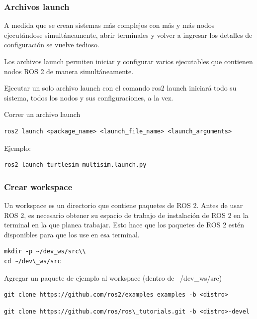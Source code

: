 \begin{frame}[fragile]
	\frametitle{Archivos launch}
	
	A medida que se crean sistemas más complejos con más y más nodos ejecutándose simultáneamente, abrir terminales y volver a ingresar los detalles de configuración se vuelve tedioso.
	
	Los archivos launch permiten iniciar y configurar varios ejecutables que contienen nodos ROS 2 de manera simultáneamente.
	
	Ejecutar un solo archivo launch con el comando ros2 launch iniciará todo su sistema, todos los nodos y sus configuraciones, a la vez.
	
Correr un archivo launch
\begin{lstlisting}[style=bash] 
ros2 launch <package_name> <launch_file_name> <launch_arguments>
\end{lstlisting}

Ejemplo:
\begin{lstlisting}[style=bash] 
ros2 launch turtlesim multisim.launch.py
\end{lstlisting}
	
\end{frame}


\begin{frame}[fragile]
    \frametitle{Crear workspace}
    
Un workspace es un directorio que contiene paquetes de ROS 2. Antes de usar ROS 2, es necesario obtener su espacio de trabajo de instalación de ROS 2 en la terminal en la que planea trabajar. Esto hace que los paquetes de ROS 2 estén disponibles para que los use en esa terminal.

\begin{lstlisting}[style=bash] 
mkdir -p ~/dev_ws/src\\
cd ~/dev\_ws/src
\end{lstlisting}

Agregar un paquete de ejemplo al workspace (dentro de ~/dev\_ws/src)
\begin{lstlisting}[style=bash] 
git clone https://github.com/ros2/examples examples -b <distro>
\end{lstlisting}

\begin{lstlisting}[style=bash] 
git clone https://github.com/ros/ros\_tutorials.git -b <distro>-devel
\end{lstlisting}
	 
\end{frame}


